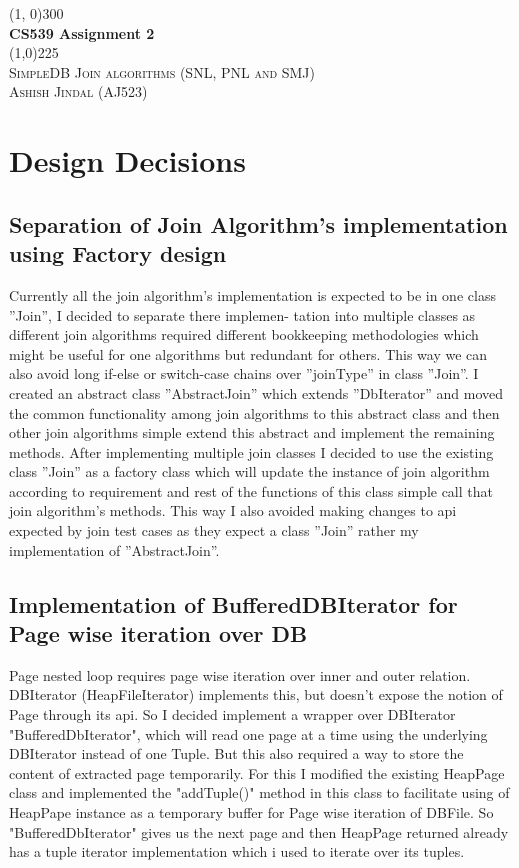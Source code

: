 \documentclass{article}
\begin{document}
\begin{titlepage}
\begin{center}

\line(1, 0){300}\\
[4mm]
\huge{\bfseries CS539 Assignment 2}\\
\line(1,0){225}\\
[4mm]
\textsc{\Large SimpleDB Join algorithms (SNL, PNL and SMJ)}\\
\textsc{\large Ashish Jindal (AJ523)}

\end{center}	

\section{Design Decisions}
\subsection{Separation of Join Algorithm's implementation using Factory design}
Currently all the join algorithm’s implementation is expected to be in one class ”Join”, I decided to separate there implemen-
tation into multiple classes as different join algorithms required different bookkeeping methodologies which might be useful
for one algorithms but redundant for others. This way we can also avoid long if-else or switch-case chains over ”joinType” in
class ”Join”. I created an abstract class ”AbstractJoin” which extends ”DbIterator” and moved the common functionality
among join algorithms to this abstract class and then other join algorithms simple extend this abstract and implement the
remaining methods. After implementing multiple join classes I decided to use the existing class ”Join” as a factory class
which will update the instance of join algorithm according to requirement and rest of the functions of this class simple call
that join algorithm’s methods. This way I also avoided making changes to api expected by join test cases as they expect a
class ”Join” rather my implementation of ”AbstractJoin”.


\subsection{Implementation of BufferedDBIterator for Page wise iteration over DB}
Page nested loop requires page wise iteration over inner and outer relation. DBIterator (HeapFileIterator) implements this, but doesn't expose the notion of Page through its api. So I decided implement a wrapper over DBIterator "BufferedDbIterator", which will read one page at a time using the underlying DBIterator instead of one Tuple. But this also required a way to store the content of extracted page temporarily. For this I modified the existing HeapPage class and implemented the "addTuple()" method in this class to facilitate using of HeapPape instance as a temporary buffer for Page wise iteration of DBFile.
So "BufferedDbIterator" gives us the next page and then HeapPage returned already has a tuple iterator implementation which i used to iterate over its tuples.


\end{titlepage}
\end{document}
